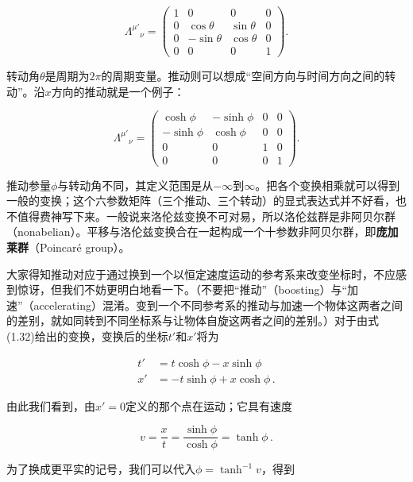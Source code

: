 \begin{equation*}
\Lambda^{\mu'}{}_{\nu}=
\begin{pmatrix}
1 & 0 & 0 & 0\\
0 & \cos\theta & \sin\theta & 0\\
0 & -\sin\theta & \cos\theta & 0\\
0 & 0 & 0 & 1
\end{pmatrix}.
\tag{1.31}
\end{equation*}

转动角$\theta$是周期为$2\pi$的周期变量。推动则可以想成“空间方向与时间方向之间的转动”。沿$x$方向的推动就是一个例子：

\begin{equation*}
\Lambda^{\mu'}{}_{\nu}=
\begin{pmatrix}
\cosh\phi & -\sinh\phi & 0 & 0\\
-\sinh\phi & \cosh\phi & 0 & 0\\
0 & 0 & 1 & 0\\
0 & 0 & 0 & 1
\end{pmatrix}.
\tag{1.32}
\end{equation*}

推动参量$\phi$与转动角不同，其定义范围是从$-\infty$到$\infty$。把各个变换相乘就可以得到一般的变换；这个六参数矩阵（三个推动、三个转动）的显式表达式并不好看，也不值得费神写下来。一般说来洛伦兹变换不可对易，所以洛伦兹群是非阿贝尔群（nonabelian）。平移与洛伦兹变换合在一起构成一个十参数非阿贝尔群，即\textbf{庞加莱群}（Poincaré group）。

大家得知推动对应于通过换到一个以恒定速度运动的参考系来改变坐标时，不应感到惊讶，但我们不妨更明白地看一下。（不要把“推动”（boosting）与“加速”（accelerating）混淆。变到一个不同参考系的推动与加速一个物体这两者之间的差别，就如同转到不同坐标系与让物体自旋这两者之间的差别。）对于由式(1.32)给出的变换，变换后的坐标$t'$和$x'$将为

\begin{align*}
t'&=t\cosh\phi-x\sinh\phi\\
x'&=-t\sinh\phi+x\cosh\phi\,.
\tag{1.33}
\end{align*}

由此我们看到，由$x'=0$定义的那个点在运动；它具有速度

\begin{equation*}
v=\frac{x}{t}=\frac{\sinh\phi}{\cosh\phi}=\tanh\phi\,.
\tag{1.34}
\end{equation*}

为了换成更平实的记号，我们可以代入$\phi=\tanh^{-1}v$，得到

